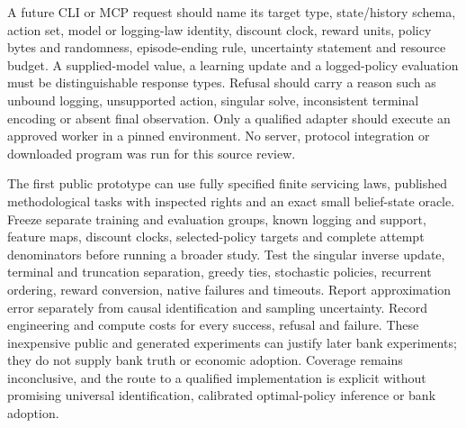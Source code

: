 A future CLI or MCP request should name its target type, state/history schema, action set, model or logging-law identity, discount clock, reward units, policy bytes and randomness, episode-ending rule, uncertainty statement and resource budget. A supplied-model value, a learning update and a logged-policy evaluation must be distinguishable response types. Refusal should carry a reason such as unbound logging, unsupported action, singular solve, inconsistent terminal encoding or absent final observation. Only a qualified adapter should execute an approved worker in a pinned environment. No server, protocol integration or downloaded program was run for this source review.~\citep{exec24_policyjava_comparison}

The first public prototype can use fully specified finite servicing laws, published methodological tasks with inspected rights and an exact small belief-state oracle. Freeze separate training and evaluation groups, known logging and support, feature maps, discount clocks, selected-policy targets and complete attempt denominators before running a broader study. Test the singular inverse update, terminal and truncation separation, greedy ties, stochastic policies, recurrent ordering, reward conversion, native failures and timeouts. Report approximation error separately from causal identification and sampling uncertainty. Record engineering and compute costs for every success, refusal and failure. These inexpensive public and generated experiments can justify later bank experiments; they do not supply bank truth or economic adoption. Coverage remains inconclusive, and the route to a qualified implementation is explicit without promising universal identification, calibrated optimal-policy inference or bank adoption.~\citep{exec24_policyjava_comparison}
